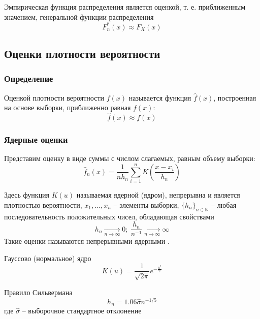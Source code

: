 \documentclass[12pt]{article}
\begin{document}
	Эмпирическая функция распределения является оценкой, т. е. приближенным значением, генеральной функции распределения
	\begin{equation}
		F^*_n(x)\approx F_X(x)
	\end{equation}

	\subsection{Оценки плотности вероятности}
	
	\subsubsection{Определение}
	
	Оценкой плотности вероятности $f(x)$ называется функция $\widehat{f}(x)$, построенная на основе выборки, приближенно равная $f(x)$:
	\begin{equation}
		\widehat{f}(x) \approx f(x)
	\end{equation}

	\subsubsection{Ядерные оценки}
	
	Представим оценку в виде суммы с числом слагаемых, равным объему выборки:
	\begin{equation}
		\widehat{f}_n(x) = \dfrac{1}{nh_n}\sum\limits_{i=1}^nK\left(\dfrac{x-x_i}{h_n}\right)
	\end{equation}

	Здесь функция $K(u)$ называемая ядерной (ядром), непрерывна и является
	плотностью вероятности, $x_1,\dots,x_n$ -- элементы выборки, $\{h_n\}_{n\in\mathbb{N}}$ -- любая последовательность положительных чисел, обладающая свойствами
	\begin{equation}
		h_n \xrightarrow[n\rightarrow\infty]{} 0;\ \dfrac{h_n}{n^{-1}}\xrightarrow[n\rightarrow\infty]{}\infty
	\end{equation}
	Такие оценки называются непрерывными ядерными \cite[с. 421-423]{prob_book}.
	
	Гауссово (нормальное) ядро \cite[c. 38]{regression}
	\begin{equation}
		K(u) = \dfrac{1}{\sqrt{2\pi}}e^{-\frac{u^2}{2}}
	\end{equation}
	
	Правило Сильвермана \cite[c. 44]{regression}
	\begin{equation}
		h_n = 1.06\hat{\sigma}n^{-1/5}
	\end{equation}
	где $\hat{\sigma}$ -- выборочное стандартное отклонение
	
\end{document}
